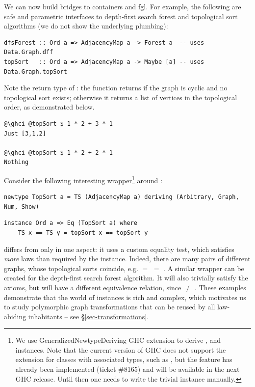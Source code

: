 We can now build bridges to \textsf{containers} and \textsf{fgl}. For example,
the following are safe and parametric interfaces to depth-first
search forest and topological sort algorithms (we do not show the underlying plumbing):

\begin{verbatim}
dfsForest :: Ord a => AdjacencyMap a -> Forest a  -- uses Data.Graph.dff
topSort   :: Ord a => AdjacencyMap a -> Maybe [a] -- uses Data.Graph.topSort
\end{verbatim}

\noindent
Note the return type of : the function returns 
if the graph is cyclic and no topological sort exists; otherwise it
returns a list of vertices in the topological order, as demonstrated below.

\begin{verbatim}
@\ghci @topSort $ 1 * 2 + 3 * 1
Just [3,1,2]

@\ghci @topSort $ 1 * 2 + 2 * 1
Nothing
\end{verbatim}

Consider the following interesting
wrapper\footnote{We use \textsf{GeneralizedNewtypeDeriving} GHC
extension to derive ,  and  instances. Note that
the current version of GHC does not support the extension for classes
with associated types, such as , but the feature has already been
implemented (ticket \#8165) and will be available in the next GHC release.
Until then one needs to write the trivial  instance manually.}
around :

\begin{verbatim}
newtype TopSort a = TS (AdjacencyMap a) deriving (Arbitrary, Graph, Num, Show)
\end{verbatim}
\vspace{1mm}
\begin{verbatim}
instance Ord a => Eq (TopSort a) where
    TS x == TS y = topSort x == topSort y
\end{verbatim}

\noindent
{} differs from  only in one aspect: it uses
a custom equality test, which satisfies \emph{more} laws than required by the 
instance. Indeed, there are many pairs of different graphs, whose topological sorts
coincide, e.g.  $=$  $=$ .
A similar  wrapper can be created for the depth-first search
forest algorithm. It will also trivially satisfy the  axioms, but will have
a different equivalence relation, since  $\neq$ .
These examples demonstrate that the world of  instances is rich and complex,
which motivates us to study polymorphic graph transformations that can be reused by
all law-abiding inhabitants -- see \S\ref{sec-transformations}.

